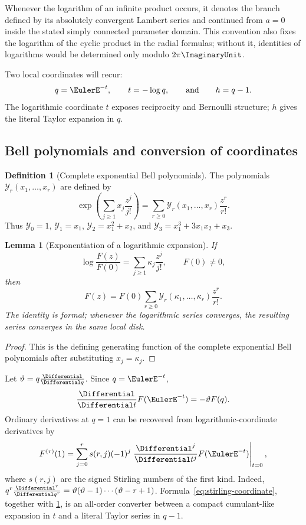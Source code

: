 \documentclass[11pt,oneside]{article}
\newtheorem{lemma}[theorem]{Lemma}
\theoremstyle{definition}
\newtheorem{definition}[theorem]{Definition}
\theoremstyle{remark}
\newcommand{\Bell}{\mathcal Y}
\newcommand{\Thetaop}{\vartheta}
\let\reportsubsection\subsection
\let\section\reportsubsection
\begin{document}
Whenever the logarithm of an infinite product occurs, it denotes the branch
defined by its absolutely convergent Lambert series and continued from
$a=0$ inside the stated simply connected parameter domain.  This convention
also fixes the logarithm of the cyclic product in the radial formulas; without
it, identities of logarithms would be determined only modulo $2\pi\ImaginaryUnit$.

Two local coordinates will recur:
\[
 q=\EulerE^{-t},\qquad t=-\log q,
 \qquad\text{and}\qquad h=q-1.
\]
The logarithmic coordinate $t$ exposes reciprocity and Bernoulli structure;
$h$ gives the literal Taylor expansion in $q$.

\section{Bell polynomials and conversion of coordinates}

\begin{definition}[Complete exponential Bell polynomials]
The polynomials $\Bell_r(x_1,\ldots,x_r)$ are defined by
\[
 \exp\left(\sum_{j\ge1}x_j\frac{z^j}{j!}\right)
 =\sum_{r\ge0}\Bell_r(x_1,\ldots,x_r)\frac{z^r}{r!}.
\]
Thus $\Bell_0=1$, $\Bell_1=x_1$,
$\Bell_2=x_1^2+x_2$, and
$\Bell_3=x_1^3+3x_1x_2+x_3$.
\end{definition}

\begin{lemma}[Exponentiation of a logarithmic expansion]\label{lem:bell-exp}
If
\[
 \log\frac{F(z)}{F(0)}
 =\sum_{j\ge1}\kappa_j\frac{z^j}{j!},
 \qquad F(0)\ne0,
\]
then
\[
 F(z)=F(0)\sum_{r\ge0}
 \Bell_r(\kappa_1,\ldots,\kappa_r)\frac{z^r}{r!}.
\]
The identity is formal; whenever the logarithmic series converges, the resulting
series converges in the same local disk.
\end{lemma}

\begin{proof}
This is the defining generating function of the complete exponential Bell
polynomials after substituting $x_j=\kappa_j$.
\end{proof}

Let $\Thetaop=q\frac{\Differential}{\Differential q}$.  Since $q=\EulerE^{-t}$,
\[
 \frac{\Differential}{\Differential t}F(\EulerE^{-t})=-\Thetaop F(q).
\]
Ordinary derivatives at $q=1$ can be recovered from logarithmic-coordinate
derivatives by
\begin{equation}\label{eq:stirling-coordinate}
 F^{(r)}(1)
 =\sum_{j=0}^{r}s(r,j)(-1)^j
 \left.\frac{\Differential^j}{\Differential t^j}F(\EulerE^{-t})\right|_{t=0},
\end{equation}
where $s(r,j)$ are the signed Stirling numbers of the first kind.  Indeed,
$q^r\frac{\Differential^r}{\Differential q^r}=\Thetaop(\Thetaop-1)\cdots(\Thetaop-r+1)$.
Formula~\eqref{eq:stirling-coordinate}, together with
\cref{lem:bell-exp}, is an all-order converter between a compact cumulant-like
expansion in $t$ and a literal Taylor series in $q-1$.
\end{document}
